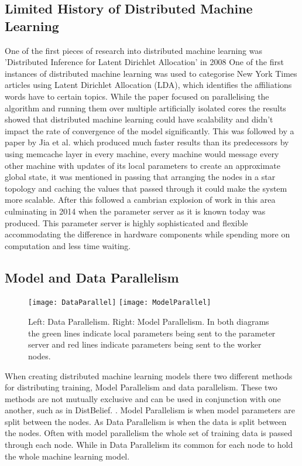 \subsection{Limited History of Distributed Machine Learning}
One of the first pieces of research into distributed machine learning was
’Distributed Inference for Latent Dirichlet Allocation’ in 2008
\cite{newman2008distributed} One of the first instances of distributed machine
learning  was  used  to  categorise  New York  Times  articles  using  Latent
Dirichlet Allocation (LDA), which identifies the affiliations words have to
certain topics.  While the paper focused on parallelising the algorithm and
running them over multiple artificially isolated cores the results showed that
distributed machine learning could have scalability and didn’t impact the rate
of convergence of the model significantly. This was followed by a paper by Jia
et al. \cite{ParallelTopicModels} which produced much faster results than its
predecessors by using memcache layer in every machine, every machine would
message every other machine with updates of its local parameters to create an
approximate global state, it was mentioned in passing that arranging the nodes
in a star topology and caching the values that passed through it could make the
system more scalable. After this followed a cambrian explosion of work in this
area \cite{Ahmed2012YahooLDA, li2014communication, Dean2012Distbelief,
googlemapreduce2008} culminating in 2014 when the parameter server as it is
known today \cite{LI2014ParameterServers} was produced. This parameter server is
highly sophisticated and flexible accommodating the difference in hardware
components while spending more on computation and less time waiting.



\subsection{Model and Data Parallelism}
\begin{figure}[h]
    \centering
    \texttt{[image: DataParallel]}
    \texttt{[image: ModelParallel]}
    \caption{Left: Data Parallelism. Right: Model Parallelism. In both diagrams
        the green lines indicate local parameters being sent to the parameter
        server and red lines indicate parameters being sent to the worker nodes.}
\end{figure}
When creating distributed machine learning models there two different methods
for distributing training, Model Parallelism and data parallelism. These two
methods are not mutually exclusive and can be used in conjunction with one
another, such as in DistBelief. \cite{Dean2012Distbelief}. Model Parallelism is
when model parameters are split between the nodes. As Data Parallelism is when
the data is split between the nodes. \cite{Xing2015Petuum} Often with model
parallelism the whole set of training data is passed through each node. While in
Data Parallelism its common for each node to hold the whole machine learning
model.

